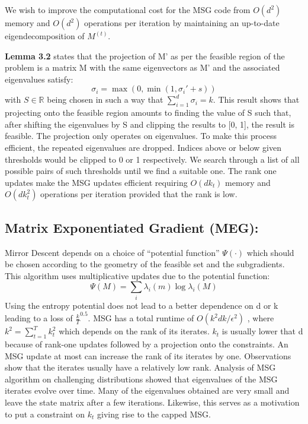 \documentclass{article}
\begin{document}
We wish to improve the computational cost for the MSG code from $O\left( d^{2}\right) $ memory and $O\left( d^{2}\right) $ operations per iteration by maintaining an up-to-date eigendecomposition of $M^{(t)}$.

\textbf{Lemma 3.2} states that the projection of M’ as per the feasible region of the problem is a matrix M with the same eigenvectors as M’ and the associated eigenvalues satisfy:
\begin{equation}
    \sigma _{i}=\max \left( 0,\min \left( 1,\sigma _{i}'+s\right) \right)
\end{equation}
with $S \in \mathbb{R}$ being chosen in such a way that $\sum ^{d}_{i=1}\sigma _{i}=k$.
This result shows that projecting onto the feasible region amounts to finding the value of S such that, after shifting the eigenvalues by S and clipping the results to [0, 1], the result is feasible. The projection only operates on eigenvalues. To make this process efficient, the repeated eigenvalues are dropped. Indices above or below given thresholds would be clipped to 0 or 1 respectively. We search through a list of all possible pairs of such thresholds until we find a suitable one. The rank one updates make the MSG updates efficient requiring $O\left( dk_{t}\right) $ memory and $O\left( dk^{2}_{t}\right) $ operations per iteration provided that the rank is low.

\subsection{Matrix Exponentiated Gradient (MEG):}
Mirror Descent depends on a choice of “potential function” $\Psi \left( \cdot \right) $ which should be chosen according to the geometry of the feasible set and the subgradients. This algorithm uses multiplicative updates due to the potential function:
\begin{equation}
    \Psi \left( M\right) =\sum _{i}\lambda _{i}\left( m\right) \log \lambda _{i}\left( M\right)
\end{equation}
Using the entropy potential does not lead to a better dependence on d or k leading to a loss of $\frac{k}{T}^{0.5}$.
MSG has a total runtime of $O\left( k^{2}dk/\epsilon^{2}\right)$ , where $k^{2}=\sum ^{T}_{t=1}k^{2}_{t}$ which depends on the rank of its iterates. $k_{t}$ is usually lower that d because of rank-one updates followed by a projection onto the constraints. An MSG update at most can increase the rank of its iterates by one. Observations show that the iterates usually have a relatively low rank. Analysis of MSG algorithm on challenging distributions showed that eigenvalues of the MSG iterates evolve over time. Many of the eigenvalues obtained are very small and leave the state matrix after a few iterations. Likewise, this serves as a motivation to put a constraint on $k_{t}$ giving rise to the capped MSG.
\end{document}
